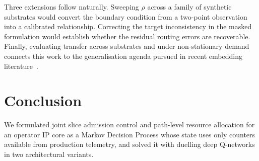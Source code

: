 \documentclass[10pt,journal,comsoc]{IEEEtran}
\begin{document}
Three extensions follow naturally. Sweeping $\rho$ across a family of
synthetic substrates would convert the boundary condition from a
two-point observation into a calibrated relationship. Correcting the
target inconsistency in the masked formulation would establish whether
the residual routing errors are recoverable. Finally, evaluating transfer
across substrates and under non-stationary demand connects this work to
the generalisation agenda pursued in recent embedding
literature~\cite{wang2024flagvne}.

\section{Conclusion} \label{conclusion}
We formulated joint slice admission control and path-level resource
allocation for an operator IP core as a Markov Decision Process whose
state uses only counters available from production telemetry, and solved
it with duelling deep Q-networks in two architectural variants.
\end{document}
